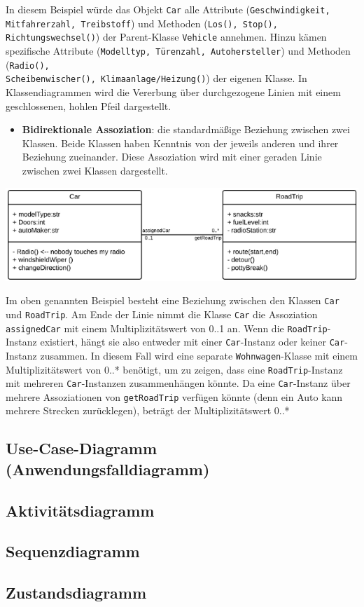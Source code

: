 In diesem Beispiel würde das Objekt \texttt{Car} alle Attribute (\texttt{Geschwindigkeit, Mitfahrerzahl, Treibstoff}) und Methoden (\texttt{Los(), Stop(), Richtungswechsel()}) der Parent-Klasse \texttt{Vehicle} annehmen. Hinzu kämen spezifische Attribute (\texttt{Modelltyp, Türenzahl, Autohersteller}) und Methoden (\texttt{Radio(), \\Scheibenwischer(), Klimaanlage/Heizung()}) der eigenen Klasse. In Klassendiagrammen wird die Vererbung über durchgezogene Linien mit einem geschlossenen, hohlen Pfeil dargestellt.

\begin{itemize}
	\item \textbf{Bidirektionale Assoziation}: die standardmäßige Beziehung zwischen zwei Klassen. Beide Klassen haben Kenntnis von der jeweils anderen und ihrer Beziehung zueinander. Diese Assoziation wird mit einer geraden Linie zwischen zwei Klassen dargestellt.
\end{itemize}

\includegraphics[width=\textwidth]{Bilder/Klassendiagramm/BidirektionaleAssoziation.png}

Im oben genannten Beispiel besteht eine Beziehung zwischen den Klassen \texttt{Car} und \texttt{RoadTrip}. Am Ende der Linie nimmt die Klasse \texttt{Car} die Assoziation \texttt{assignedCar} mit einem Multiplizitätswert von 0..1 an. Wenn die \texttt{RoadTrip}-Instanz existiert, hängt sie also entweder mit einer \texttt{Car}-Instanz oder keiner \texttt{Car}-Instanz zusammen. In diesem Fall wird eine separate \texttt{Wohnwagen}-Klasse mit einem Multiplizitätswert von 0..* benötigt, um zu zeigen, dass eine \texttt{RoadTrip}-Instanz mit mehreren \texttt{Car}-Instanzen zusammenhängen könnte. Da eine \texttt{Car}-Instanz über mehrere Assoziationen von \texttt{getRoadTrip} verfügen könnte (denn ein Auto kann mehrere Strecken zurücklegen), beträgt der Multiplizitätswert 0..*

\subsection{Use-Case-Diagramm (Anwendungsfalldiagramm)}
\label{sec:UseCaseDiagramm}

\subsection{Aktivitätsdiagramm}
\label{sec:Aktivitaetsdiagramm}

\subsection{Sequenzdiagramm}
\label{sec:Sequenzdiagramm}

\subsection{Zustandsdiagramm}
\label{sec:Zustandsdiagramm}